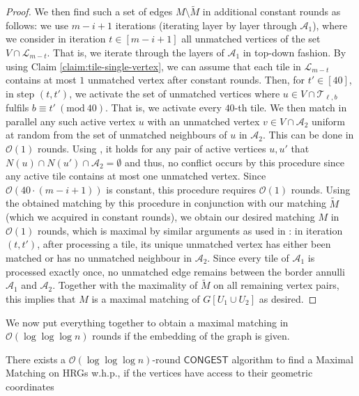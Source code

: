 \documentclass[letterpaper,11pt]{article}
\newcommand{\whp}{w.h.p.\xspace}
\newcommand{\1}{\mathbb I}
\newcommand{\bigO}{\mathcal{O}}
\newcommand{\CONGEST}{\ensuremath{\mathsf{CONGEST}}\xspace}
\newcommand{\Layer}[1]{\mathcal{L}_{#1}}
\newcommand{\tiletile}[2]{\mathcal{T}_{#1,#2}}
\begin{document}
\begin{proof}
We then find such a set of edges $M\setminus \tilde{M}$ in additional constant rounds as follows: we use $m-i+1$ iterations (iterating layer by layer through $\mathcal{A}_1$), where we consider in iteration $t \in [m-i+1]$ all unmatched vertices of the set $V \cap \Layer{m-t}$. That is, we iterate through the layers of $\mathcal{A}_1$ in top-down fashion. By using Claim \ref{claim:tile-single-vertex}, we can assume that each tile in $\Layer{m-t}$ contains at most $1$ unmatched vertex after constant rounds. Then, for $t' \in [40]$, in step $(t, t')$, we activate the set of unmatched vertices where $u \in V \cap \tiletile{\ell}{b}$ fulfils $b \equiv t' \ (\mathrm{mod}\ 40)$. That is, we activate every $40$-th tile. We then match in parallel any such active vertex $u$ with an unmatched vertex $v \in V \cap \mathcal{A}_2$ uniform at random from the set of unmatched neighbours of $u$ in $\mathcal{A}_2$. This can be done in $\bigO(1)$ rounds. Using , it holds for any pair of active vertices $u,u'$ that $N(u) \cap N(u') \cap \mathcal{A}_2 = \emptyset$ and thus, no conflict occurs by this procedure since any active tile contains at most one unmatched vertex. Since $\bigO(40\cdot(m-i+1))$ is constant, this procedure requires $\bigO(1)$ rounds. Using the obtained matching by this procedure in conjunction with our matching $\tilde{M}$ (which we acquired in constant rounds), we obtain our desired matching $M$ in $\bigO(1)$ rounds, which is maximal by similar arguments as used in : in iteration $(t,t')$, after processing a tile, its unique unmatched vertex has either been matched or has no unmatched neighbour in $\mathcal{A}_2$. Since every tile of $\mathcal{A}_1$
is processed exactly once, no unmatched edge remains between the border annulli $\mathcal{A}_1$ and $\mathcal{A}_2$. Together with the maximality of $\tilde{M}$ on all remaining vertex pairs, this implies that $M$ is a maximal matching of $G[U_1 \cup U_2]$ as desired.
\end{proof}
%
We now put everything together to obtain a maximal matching in $\bigO(\log\log\log n)$ rounds if the embedding of the graph is given.
%
\begin{proposition}
     There exists a $\bigO(\log\log\log n)$-round \CONGEST algorithm to find a Maximal Matching on HRGs \whp, if the vertices have access to their geometric coordinates
\end{proposition}
%
\end{document}

